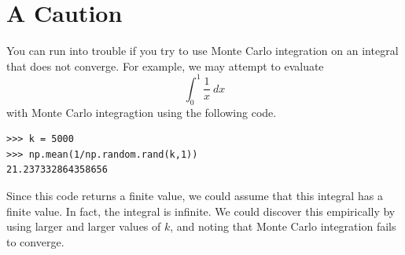 \section*{A Caution}
You can run into trouble if you try to use Monte Carlo integration on an integral that does not converge.
For example, we may attempt to evaluate
\[
\int_0^1 \frac{1}{x}\:dx
\]
with Monte Carlo integragtion using the following code.
\begin{lstlisting}
>>> k = 5000
>>> np.mean(1/np.random.rand(k,1))
21.237332864358656
\end{lstlisting}

Since this code returns a finite value, we could assume that this integral has a finite value.
In fact, the integral is infinite.
We could discover this empirically by using larger and larger values of $k$, and noting that Monte Carlo integration fails to converge.

